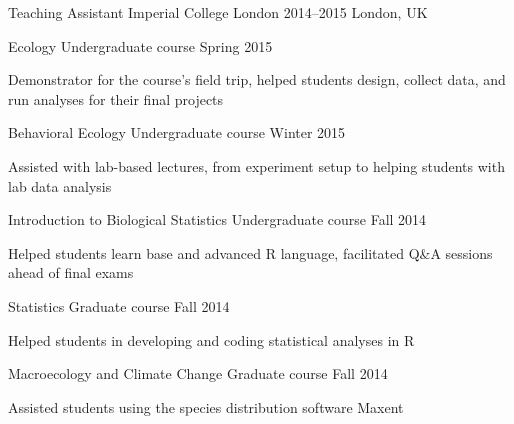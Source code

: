 \begin{cventries}
 \cventry
    {Teaching Assistant} %
    {Imperial College London} %
    {2014--2015} %
    {London, UK} %
    {
      \begin{cvsubentries}
       \cvsubentry
         {Ecology}
         {\footnotesize Undergraduate course}
         {Spring 2015}
         {
         \begin{cvitems}
          \item Demonstrator for the course's field trip, helped students design, collect data, and run analyses for their final projects
         \end{cvitems} 
         }
       \cvsubentry
         {Behavioral Ecology}
         {\footnotesize Undergraduate course}
         {Winter 2015}
         {
         \begin{cvitems}
          \item Assisted with lab-based lectures, from experiment setup to helping students with lab data analysis
         \end{cvitems} 
         }
       \cvsubentry
         {Introduction to Biological Statistics}
         {\footnotesize Undergraduate course}
         {Fall 2014}
         {
         \begin{cvitems}
          \item Helped students learn base and advanced R language, facilitated Q\&A sessions ahead of final exams
         \end{cvitems} 
         }
       \cvsubentry
        {Statistics}
        {\footnotesize Graduate course}
        {Fall 2014}
        {
          \begin{cvitems}
          \item Helped students in developing and coding statistical analyses in R
         \end{cvitems}
        }  
       \cvsubentry
        {Macroecology and Climate Change}
        {\footnotesize Graduate course}
        {Fall 2014}
        {
          \begin{cvitems}
          \item Assisted students using the species distribution software Maxent
         \end{cvitems}
        }   
      \end{cvsubentries}
    }
\end{cventries}
